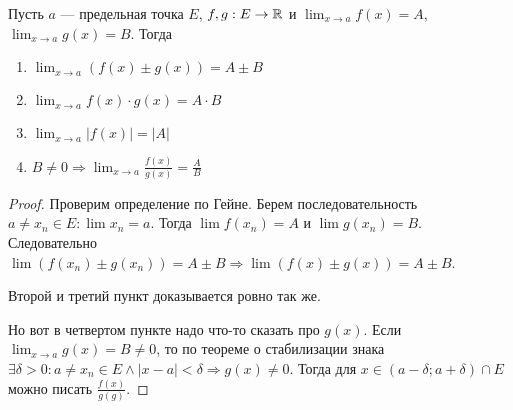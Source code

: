 \begin{theorem}
    Пусть $a$ --- предельная точка  $E$,  $f, g: E \to \mathbb{R}$ и  $\lim_{x\to a} f(x)=A$,  $\lim_{x\to a} g(x)=B$. Тогда 
    \begin{enumerate}
        \item $\lim_{x\to a} (f(x) \pm g(x)) = A \pm B$
        \item $\lim_{x\to a} f(x) \cdot g(x) = A \cdot B$
        \item $\lim_{x\to a} |f(x)| = |A|$
        \item $B \neq 0 \Rightarrow \lim_{x\to a} \frac{f(x)}{g(x)} = \frac{A}{B}$
    \end{enumerate}
\end{theorem}
\begin{proof}
    Проверим определение по Гейне. Берем последовательность $a \neq x_n \in E: \lim x_n = a$. Тогда  $\lim f(x_n) = A$  и  $\lim g(x_n) = B$. Следовательно  $\lim (f(x_n) \pm g(x_n)) = A \pm B \Rightarrow \lim (f(x) \pm g(x)) = A \pm B$.

    Второй и третий пункт доказывается ровно так же.

    Но вот в четвертом пункте надо что-то сказать про $g(x)$. Если  $\lim_{x\to a} g(x) = B \neq 0$, то по теореме о стабилизации знака $\exists \delta > 0: a \neq x_n \in E \land |x-a| < \delta \Rightarrow g(x) \neq 0$. Тогда для $x \in (a-\delta; a + \delta) \cap E$ можно писать  $\frac{f(x)}{g(g)}$.
\end{proof}

